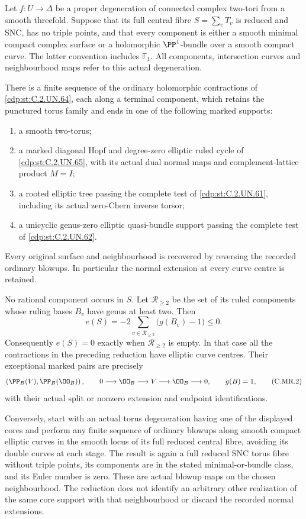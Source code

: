 \begin{proposition}
Let $f:U\to\Delta$ be a proper degeneration of connected complex
two-tori from a smooth threefold. Suppose that its full central
fibre $S=\sum_vT_v$ is reduced and SNC, has no triple points,
and that every component is either a smooth minimal compact
complex surface or a holomorphic $\PP^1$-bundle over a smooth
compact curve. The latter convention includes $\mathbb F_1$.
All components, intersection curves and neighbourhood maps refer
to this actual degeneration.

There is a finite sequence of the ordinary holomorphic
contractions of \ref{cdp:st:C.2.UN.64}, each along a terminal component, which
retains the punctured torus family and ends in one of the
following marked supports:
\begin{enumerate}
\item a smooth two-torus;
\item a marked diagonal Hopf and degree-zero elliptic ruled
cycle of \ref{cdp:st:C.2.UN.65}, with its actual dual normal maps and
complement-lattice product $M=I$;
\item a rooted elliptic tree passing the complete test of
\ref{cdp:st:C.2.UN.61}, including its actual zero-Chern inverse torsor;
\item a unicyclic genus-zero elliptic quasi-bundle support
passing the complete test of \ref{cdp:st:C.2.UN.62}.
\end{enumerate}
Every original surface and neighbourhood is recovered by
reversing the recorded ordinary blowups. In particular the
normal extension at every curve centre is retained.

No rational component occurs in $S$. Let $\mathcal R_{\ge2}$
be the set of its ruled components whose ruling bases $B_v$
have genus at least two. Then
\[
 e(S)=-2\sum_{v\in\mathcal R_{\ge2}}\bigl(g(B_v)-1\bigr)
                                                        \le0.
\tag{C.MR.1}\label{cdp:eq:C.MR.1}
\]
Consequently $e(S)=0$ exactly when $\mathcal R_{\ge2}$ is
empty. In that case all the contractions in the preceding
reduction have elliptic curve centres. Their exceptional
marked pairs are precisely
\[
 \left(\PP_B(V),\PP_B(\OO_B)\right),
 \qquad
 0\longrightarrow\OO_B\longrightarrow V
             \longrightarrow\OO_B\longrightarrow0,
 \qquad g(B)=1,
\tag{C.MR.2}\label{cdp:eq:C.MR.2}
\]
with their actual split or nonzero extension and endpoint
identifications.

Conversely, start with an actual torus degeneration having
one of the displayed cores and perform any finite sequence of
ordinary blowups along smooth compact elliptic curves in the
smooth locus of its full reduced central fibre, avoiding its
double curves at each stage. The result is again a full
reduced SNC torus fibre without triple points, its components
are in the stated minimal-or-bundle class, and its Euler
number is zero. These are actual blowup maps on the chosen
neighbourhood. The reduction does not identify an arbitrary
other realization of the same core support with that
neighbourhood or discard the recorded normal extensions.


\end{proposition}

